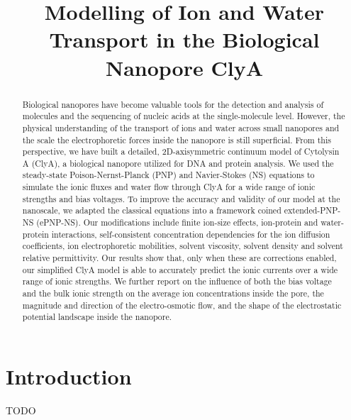 \documentclass[journal=ancac3, manuscript=article, etalmode=truncate,maxauthors=0]{achemso}
\title{Modelling of Ion and Water Transport in the Biological Nanopore ClyA}
\begin{document}
\maketitle
\newpage
\begin{abstract}
Biological nanopores have become valuable tools for the detection and analysis of molecules and the sequencing of nucleic acids at the single-molecule level. However, the physical understanding of the transport of ions and water across small nanopores and the scale the electrophoretic forces inside the nanopore is still superficial. From this perspective, we have built a detailed, 2D-axisymmetric continuum model of Cytolysin A (ClyA), a biological nanopore utilized for DNA and protein analysis. We used the steady-state Poison-Nernst-Planck (PNP) and Navier-Stokes (NS) equations to simulate the ionic fluxes and water flow through ClyA for a wide range of ionic strengths and bias voltages. To improve the accuracy and validity of our model at the nanoscale, we adapted the classical equations into a framework coined extended-PNP-NS (ePNP-NS). Our modifications include finite ion-size effects, ion-protein and water-protein interactions, self-consistent concentration dependencies for the ion diffusion coefficients, ion electrophoretic mobilities, solvent viscosity, solvent density and solvent relative permittivity. Our results show that, only when these are corrections enabled, our simplified ClyA model is able to accurately predict the ionic currents over a wide range of ionic strengths. We further report on the influence of both the bias voltage and the bulk ionic strength on the average ion concentrations inside the pore, the magnitude and direction of the electro-osmotic flow, and the shape of the electrostatic potential landscape inside the nanopore.
\end{abstract}
\newpage
\section{Introduction}


TODO
\end{document}
